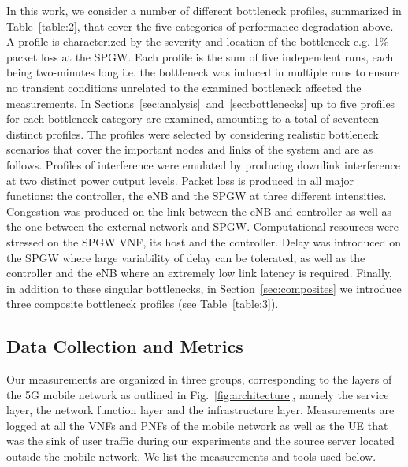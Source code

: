 \documentclass[journal,comsoc]{IEEEtran}
\begin{document}
In this work, we consider a number of different bottleneck profiles, summarized in Table~\ref{table:2}, that cover the five categories of performance degradation above.
A profile is characterized by the severity and location of the bottleneck e.g. 1\% packet loss at the SPGW.
Each profile is the sum of five independent runs, each being two-minutes long i.e. the bottleneck was induced in multiple runs to ensure no transient conditions unrelated to the examined bottleneck affected the measurements.
In Sections~\ref{sec:analysis}~and~\ref{sec:bottlenecks} up to five profiles for each bottleneck category are examined, amounting to a total of seventeen distinct profiles. 
The profiles were selected by considering realistic bottleneck scenarios that cover the important nodes and links of the system and are as follows.
Profiles of interference were emulated by producing downlink interference at two distinct power output levels.
Packet loss is produced in all major functions: the controller, the eNB and the SPGW at three different intensities. 
Congestion was produced on the link between the eNB and controller as well as the one between the external network and SPGW.
Computational resources were stressed on the SPGW VNF, its host and the controller.
Delay was introduced on the SPGW where large variability of delay can be tolerated, as well as the controller and the eNB where an extremely low link latency is required.
Finally, in addition to these singular bottlenecks, in Section~\ref{sec:composites} we introduce three composite bottleneck profiles  (see Table~\ref{table:3}). 

% 
\subsection{Data Collection and Metrics}
\label{sec:methodology_metrics}

Our measurements are organized in three groups, corresponding to the layers of the 5G mobile network as outlined in Fig.~\ref{fig:architecture}, namely the service layer, the network function layer and the infrastructure layer.
Measurements are logged at all the VNFs and PNFs of the mobile network as well as the UE that was the sink of user traffic during our experiments and the source server located outside the mobile network. 
We list the measurements and tools used below.
\end{document}
